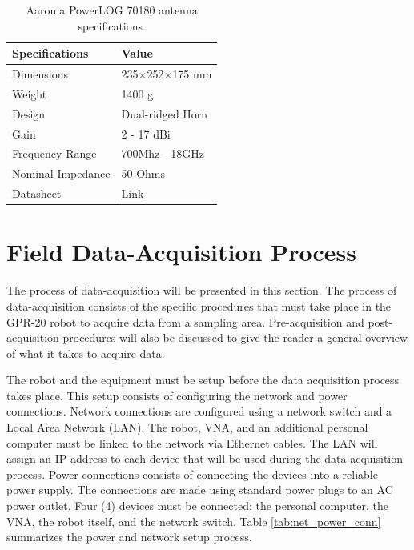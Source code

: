\documentclass{article}
\begin{document}
\begin{table}[h]
    \centering
    \begin{tabular}{|l|l|}
        \hline \textbf{Specifications} & \textbf{Value} \\ \hline
        Dimensions & 235$\times$252$\times$175 mm \\ \hline
        Weight & 1400 g \\ \hline
        Design & Dual-ridged Horn \\ \hline
        Gain & 2 - 17 dBi \\ \hline
        Frequency Range & 700Mhz - 18GHz \\ \hline
        Nominal Impedance & 50 Ohms \\ \hline
        Datasheet & \href{https://downloads.aaronia.com/datasheets/antennas/PowerLOG/Aaronia_PowerLOG_Horn_Antennas.pdf##}{Link} \\ \hline
    \end{tabular}
    \caption{Aaronia PowerLOG 70180 antenna specifications.}
    \label{tab:antenna_specs}
\end{table}


\section{Field Data-Acquisition Process}
The process of data-acquisition will be presented in this section. The process of data-acquisition consists of the specific procedures that must take place in the GPR-20 robot to acquire data from a sampling area. Pre-acquisition and post-acquisition procedures will also be discussed to give the reader a general overview of what it takes to acquire data. 

The robot and the equipment must be setup before the data acquisition process takes place. This setup consists of configuring the network and power connections. Network connections are configured using a network switch and a Local Area Network (LAN). The robot, VNA, and an additional personal computer must be linked to the network via Ethernet cables. The LAN will assign an IP address to each device that will be used during the data acquisition process. Power connections consists of connecting the devices into a reliable power supply. The connections are made using standard power plugs to an AC power outlet. Four (4) devices must be connected: the personal computer, the VNA, the robot itself, and the network switch. Table \ref{tab:net_power_conn} summarizes the power and network setup process.
\end{document}
